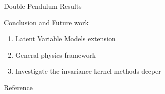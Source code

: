 \documentclass{beamer}
\begin{document}
\begin{frame}{Double Pendulum Results}
	
	
\end{frame}

\begin{frame}{Conclusion and Future work}
  \begin{enumerate}
    \item Latent Variable Models extension
    \item General physics framework 
    \item Investigate the invariance kernel methods deeper
  \end{enumerate}
  
\end{frame}

\begin{frame}[allowframebreaks]{Reference}
\printbibliography

\end{frame}


 
\end{document}
